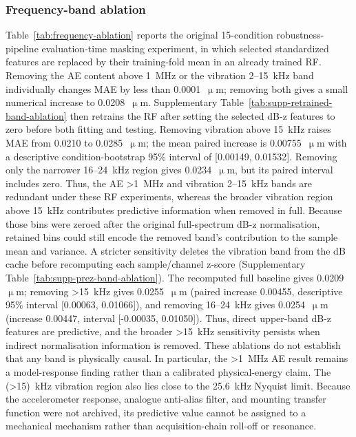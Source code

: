 \subsubsection{Frequency-band ablation}

Table~\ref{tab:frequency-ablation} reports the original 15-condition robustness-pipeline evaluation-time
masking experiment, in which selected standardized features are replaced by
their training-fold mean in an already trained RF. Removing the AE content
above 1~MHz or the vibration 2--15~kHz band individually changes MAE by
less than 0.0001~\(\upmu\)m; removing both gives a small numerical increase
to 0.0208~\(\upmu\)m. Supplementary
Table~\ref{tab:supp-retrained-band-ablation} then retrains the RF after
setting the selected dB-z features to zero before both fitting and testing.
Removing vibration above 15~kHz raises MAE from 0.0210 to
0.0285~\(\upmu\)m; the mean paired increase is 0.00755~\(\upmu\)m with a
descriptive condition-bootstrap 95\% interval of [0.00149, 0.01532]. Removing
only the narrower 16--24~kHz region gives 0.0234~\(\upmu\)m, but its paired
interval includes zero. Thus, the AE >1~MHz and vibration 2--15~kHz bands
are redundant under these RF experiments, whereas the broader vibration
region above 15~kHz contributes predictive information when removed in full.
Because those bins were zeroed after the original full-spectrum dB-z
normalisation, retained bins could still encode the removed band's contribution
to the sample mean and variance. A stricter sensitivity deletes the vibration
band from the dB cache before recomputing each sample/channel z-score
(Supplementary Table~\ref{tab:supp-prez-band-ablation}). The recomputed full
baseline gives 0.0209~\(\upmu\)m; removing >15~kHz gives 0.0255~\(\upmu\)m
(paired increase 0.00455, descriptive 95\% interval [0.00063, 0.01066]), and
removing 16--24~kHz gives 0.0254~\(\upmu\)m (increase 0.00447, interval
[-0.00035, 0.01050]). Thus, direct upper-band dB-z features are predictive,
and the broader >15~kHz sensitivity persists when indirect normalisation
information is removed.
These ablations do not establish that any band is physically causal. In
particular, the >1~MHz AE result remains a model-response finding rather than
a calibrated physical-energy claim. The (>15)~kHz vibration region also
lies close to the 25.6~kHz Nyquist limit. Because the accelerometer response,
analogue anti-alias filter, and mounting transfer function were not archived,
its predictive value cannot be assigned to a mechanical mechanism rather
than acquisition-chain roll-off or resonance.

